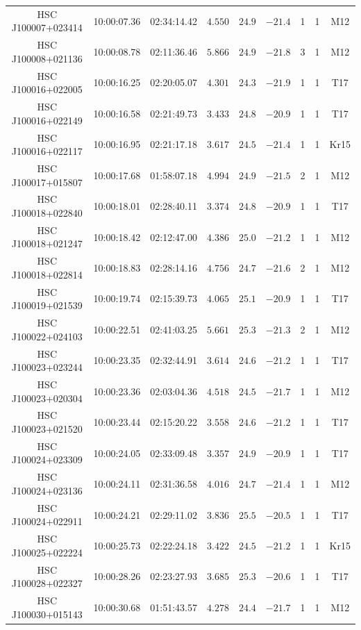 \documentclass[]{pasj01}
\begin{document}
{\begin{longtable}{ccccccccc}
HSC J100007+023414 & 10:00:07.36 & 02:34:14.42 & $4.550$ & $24.9$ & $-21.4$ & 1 & 1 & M12 \\
HSC J100008+021136 & 10:00:08.78 & 02:11:36.46 & $5.866$ & $24.9$ & $-21.8$ & 3 & 1 & M12 \\
HSC J100016+022005 & 10:00:16.25 & 02:20:05.07 & $4.301$ & $24.3$ & $-21.9$ & 1 & 1 & T17 \\
HSC J100016+022149 & 10:00:16.58 & 02:21:49.73 & $3.433$ & $24.8$ & $-20.9$ & 1 & 1 & T17 \\
HSC J100016+022117 & 10:00:16.95 & 02:21:17.18 & $3.617$ & $24.5$ & $-21.4$ & 1 & 1 & Kr15 \\
HSC J100017+015807 & 10:00:17.68 & 01:58:07.18 & $4.994$ & $24.9$ & $-21.5$ & 2 & 1 & M12 \\
HSC J100018+022840 & 10:00:18.01 & 02:28:40.11 & $3.374$ & $24.8$ & $-20.9$ & 1 & 1 & T17 \\
HSC J100018+021247 & 10:00:18.42 & 02:12:47.00 & $4.386$ & $25.0$ & $-21.2$ & 1 & 1 & M12 \\
HSC J100018+022814 & 10:00:18.83 & 02:28:14.16 & $4.756$ & $24.7$ & $-21.6$ & 2 & 1 & M12 \\
HSC J100019+021539 & 10:00:19.74 & 02:15:39.73 & $4.065$ & $25.1$ & $-20.9$ & 1 & 1 & T17 \\
HSC J100022+024103 & 10:00:22.51 & 02:41:03.25 & $5.661$ & $25.3$ & $-21.3$ & 2 & 1 & M12 \\
HSC J100023+023244 & 10:00:23.35 & 02:32:44.91 & $3.614$ & $24.6$ & $-21.2$ & 1 & 1 & T17 \\
HSC J100023+020304 & 10:00:23.36 & 02:03:04.36 & $4.518$ & $24.5$ & $-21.7$ & 1 & 1 & M12 \\
HSC J100023+021520 & 10:00:23.44 & 02:15:20.22 & $3.558$ & $24.6$ & $-21.2$ & 1 & 1 & T17 \\
HSC J100024+023309 & 10:00:24.05 & 02:33:09.48 & $3.357$ & $24.9$ & $-20.9$ & 1 & 1 & T17 \\
HSC J100024+023136 & 10:00:24.11 & 02:31:36.58 & $4.016$ & $24.7$ & $-21.4$ & 1 & 1 & M12 \\
HSC J100024+022911 & 10:00:24.21 & 02:29:11.02 & $3.836$ & $25.5$ & $-20.5$ & 1 & 1 & T17 \\
HSC J100025+022224 & 10:00:25.73 & 02:22:24.18 & $3.422$ & $24.5$ & $-21.2$ & 1 & 1 & Kr15 \\
HSC J100028+022327 & 10:00:28.26 & 02:23:27.93 & $3.685$ & $25.3$ & $-20.6$ & 1 & 1 & T17 \\
HSC J100030+015143 & 10:00:30.68 & 01:51:43.57 & $4.278$ & $24.4$ & $-21.7$ & 1 & 1 & M12 \\

\end{longtable}}
\end{document}
